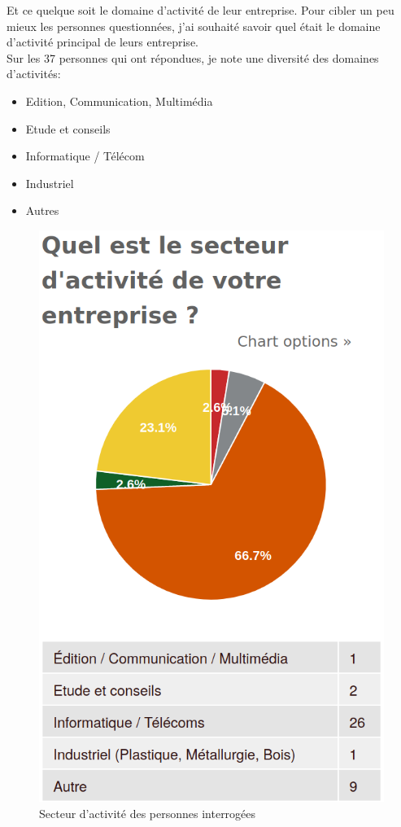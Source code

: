 			\newpage
			Et ce quelque soit le domaine d'activité de leur entreprise. Pour cibler un peu mieux les personnes questionnées, j'ai souhaité savoir quel était le domaine d'activité principal de leurs entreprise.\\

			Sur les 37 personnes qui ont répondues, je note une diversité des domaines d'activités:

			\begin{itemize}[label=\textbullet, font=\LARGE \color{burntorange}]
				\item Edition, Communication, Multimédia
				\item Etude et conseils
				\item Informatique / Télécom
				\item Industriel
				\item Autres
			\end{itemize}

			\begin{figure}[!htb]
				\center
				\includegraphics[scale=0.28]{./img/secteuractivite}
				\caption{Secteur d'activité des personnes interrogées}
			\end{figure}

